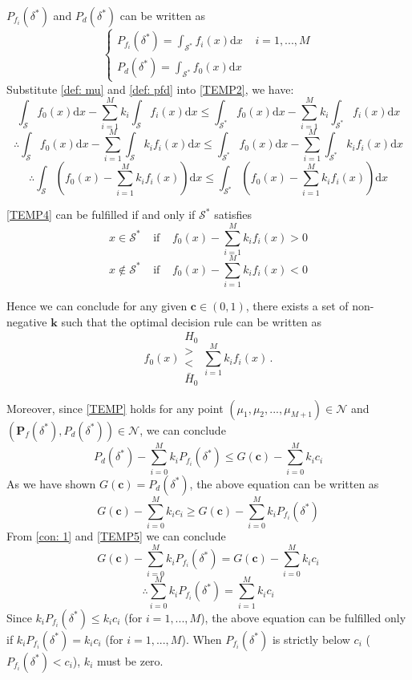 $P_{f_i}(\delta^\ast)$ and $P_{d}(\delta^\ast)$ can be written as
\begin{equation}
\label{def: pfd}
\begin{cases}
P_{f_i}(\delta^\ast) = \int_{\mathcal{S}^\ast}f_i(x)\mathrm{d}x\;\;\;\;i=1, ..., M\\
P_d(\delta^\ast) = \int_{\mathcal{S}^\ast}f_0(x)\mathrm{d}x
\end{cases}
\end{equation}
Substitute \eqref{def: mu} and \eqref{def: pfd} into \eqref{TEMP2}, we have: 
\[
\int_{\mathcal{S}}f_{0}(x)\mathrm{d}x - \sum_{i=1}^{M}k_i\int_{\mathcal{S}}f_i(x)\mathrm{d}x \leq \int_{\mathcal{S}^\ast}f_{0}(x)\mathrm{d}x - \sum_{i=1}^{M}k_i\int_{\mathcal{S}^\ast}f_i(x)\mathrm{d}x
\]
\[
\therefore 
\int_{\mathcal{S}}f_{0}(x)\mathrm{d}x - \sum_{i=1}^{M}\int_{\mathcal{S}}k_if_i(x)\mathrm{d}x \leq \int_{\mathcal{S}^\ast}f_{0}(x)\mathrm{d}x - \sum_{i=1}^{M}\int_{\mathcal{S}^\ast}k_if_i(x)\mathrm{d}x
\]
\begin{equation}
\label{TEMP4}
\therefore \int_{\mathcal{S}}(f_{0}(x)- \sum_{i=1}^{M}k_if_{i}(x))\mathrm{d}x \leq \int_{\mathcal{S}^\ast}(f_{0}(x)- \sum_{i=1}^{M}k_if_{i}(x))\mathrm{d}x 
\end{equation}

\eqref{TEMP4} can be fulfilled if and only if $\mathcal{S}^\ast$ satisfies
\[
x \in \mathcal{S}^\ast\;\;\;\;\text{if}\;\;\;\;f_{0}(x)- \sum_{i=1}^{M}k_if_{i}(x) > 0
\]
\[
x \notin \mathcal{S}^\ast\;\;\;\;\text{if}\;\;\;\;f_{0}(x)- \sum_{i=1}^{M}k_if_{i}(x) < 0
\]

Hence we can conclude for any given $\mathbf{c} \in (0, 1)$, there exists a set of non-negative $\mathbf{k}$ such that 
the optimal decision rule can be written as 
\[
f_0(x) \substack{H_0 \\ > \\ < \\ \bar{H}_0 } \sum_{i=1}^{M}k_if_i(x)\,.
\]

Moreover, since \eqref{TEMP} holds for any point $(\mu_1, \mu_2, ..., \mu_{M+1}) \in \mathcal{N}$ and $(\mathbf{P}_f(\delta^\ast), P_d(\delta^\ast)) \in \mathcal{N}$, we can conclude 
\begin{equation}
P_d(\delta^\ast) - \sum_{i=0}^{M}k_iP_{f_i}(\delta^\ast) \leq G(\mathbf{c}) - \sum_{i=0}^{M}k_ic_i
\end{equation}
As we have shown $G(\mathbf{c}) = P_d(\delta^\ast)$, the above equation can be written as
\begin{equation}
 G(\mathbf{c}) - \sum_{i=0}^{M}k_ic_i \geq G(\mathbf{c}) - \sum_{i=0}^{M}k_iP_{f_i}(\delta^\ast)
\label{TEMP5}
\end{equation}
From \eqref{con: 1} and \eqref{TEMP5}  we can conclude
\[
G(\mathbf{c}) - \sum_{i=0}^{M}k_iP_{f_i}(\delta^\ast) =  G(\mathbf{c}) - \sum_{i=0}^{M}k_ic_i
\]
\[
\therefore  \sum_{i=0}^{M}k_iP_{f_i}(\delta^\ast) =  \sum_{i=1}^{M}k_ic_i
\]
Since $k_iP_{f_i}(\delta^\ast) \leq k_ic_i$ (for $i=1, ..., M$), the above equation can be fulfilled only if $k_iP_{f_i}(\delta^\ast) = k_ic_i$ (for $i=1, ..., M$). When $P_{f_i}(\delta^\ast)$ is strictly below $c_i$ ($P_{f_i}(\delta^\ast) < c_i$), $k_i$ must be zero.

